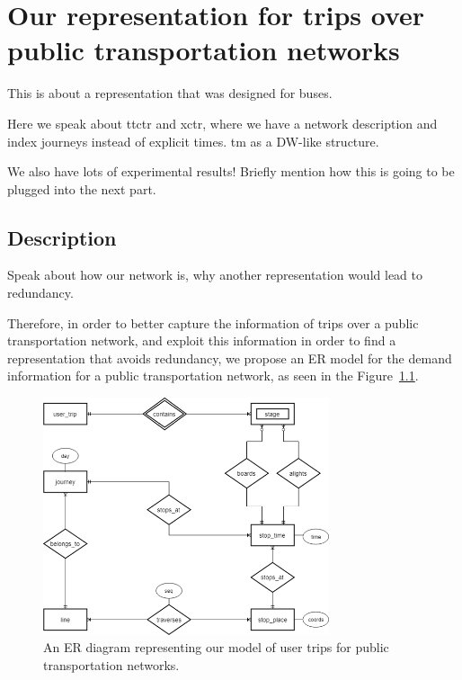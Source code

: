 \chapter{Our representation for trips over public transportation networks}
\label{sec:newctr}

	This is about a representation that was designed for buses.
	
	Here we speak about \gls{ttctr} and \gls{xctr}, where we have a network description and index journeys instead of explicit times. \gls{tm} as a DW-like structure.
	
	We also have lots of experimental results! Briefly mention how this is going to be plugged into the next part.
	
\section{Description}
    \label{sec:newctr:desc}
	Speak about how our network is, why another representation would lead to redundancy.
	
	Therefore, in order to better capture the information of trips over a public transportation network, and exploit this information in order to find a representation that avoids redundancy, we propose an ER model for the demand information for a public transportation network, as seen in the Figure~\ref{fig:er}.
	
	\begin{figure}[ht]
	    \begin{center}
        \includegraphics[width=0.75\textwidth]{figures/network_er.png}
        \caption{An ER diagram representing our model of user trips for public transportation networks.}
        \label{fig:er}
        \end{center}
    \end{figure}
    
